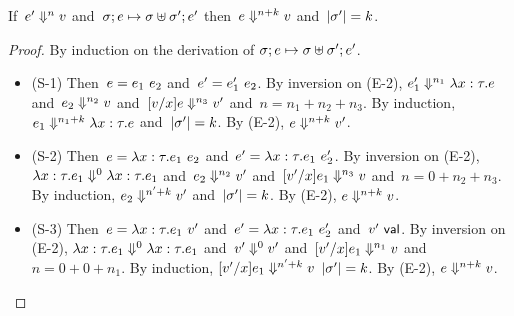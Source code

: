 \documentclass{article}
\begin{document}
\begin{lemma}\label{lem:closed}
  If~$\eval[n]{e'}{v}$
  and~$\cfg{\store}{e} \step \cfg{\stjoin{\store}{\store'}}{e'}$
  then~$\eval[n+k]{e}{v}$
  and~$|\store'| = k$.
\end{lemma}
  \begin{proof}
    By induction on the derivation of 
    $\cfg{\store}{e} \step \cfg{\stjoin{\store}{\store'}}{e'}$.
    \begin{itemize}
    \item (S-1)
      Then~$e = \kwapp{e_1}{e_2}$ and~$e' = \kwapp{e_1'}{e_2}$.
      By inversion on (E-2),
      $\eval[n_1]{e_1'}{\kwfun{x}{\tau}{e}}$
      and~$\eval[n_2]{e_2}{v}$
      and~$\eval[n_3]{\sub{v}{x}{e}}{v'}$
      and~$n = n_1 + n_2 + n_3$.
      By induction,
      $\eval[n_1 + k]{e_1}{\kwfun{x}{\tau}{e}}$
      and~$|\store'| = k$.
      By (E-2),
      $\eval[n+k]{e}{v'}$.

    \item (S-2) Then~$e = \kwapp{\kwfun{x}{\tau}{e_1}}{e_2}$
        and~$e' = \kwapp{\kwfun{x}{\tau}{e_1}}{e_2'}$.
        By inversion on (E-2),
        $\eval[0]{\kwfun{x}{\tau}{e_1}}{\kwfun{x}{\tau}{e_1}}$
        and~$\eval[n_2]{e_2}{v'}$
        and~$\eval[n_3]{\sub{v'}{x}{e_1}}{v}$
        and~$n = 0 + n_2 + n_3$.
        By induction,
        $\eval[n' + k]{e_2}{v'}$
        and~$|\store'| = k$.
        By (E-2),
        $\eval[n+k]{e}{v}$.
        
    \item (S-3) Then~$e = \kwapp{\kwfun{x}{\tau}{e_1}}{v'}$
        and~$e' = \kwapp{\kwfun{x}{\tau}{e_1}}{e_2'}$
        and~$v' \val$.
        By inversion on (E-2),
        $\eval[0]{\kwfun{x}{\tau}{e_1}}{\kwfun{x}{\tau}{e_1}}$
        and~$\eval[0]{v'}{v'}$
        and~$\eval[n_1]{\sub{v'}{x}{e_1}}{v}$
        and~$n = 0 + 0 + n_1$.
        By induction,
        $\eval[n' + k]{\sub{v'}{x}{e_1}}{v}$
        $|\store'| = k$.
        By (E-2),
        $\eval[n+k]{e}{v}$.
    

\end{itemize}
\end{proof}
\end{document}
